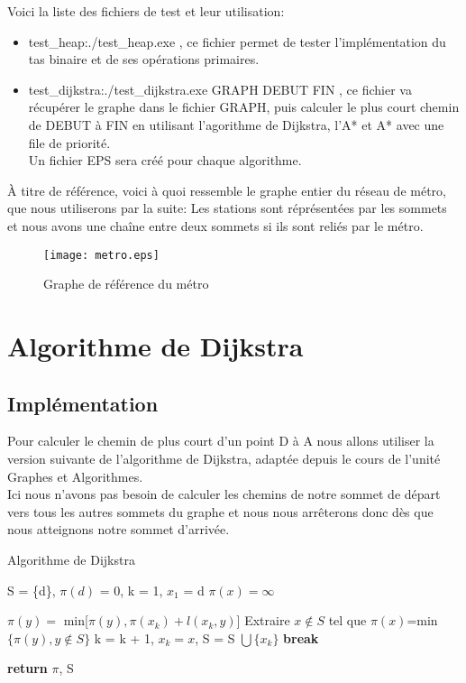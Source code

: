 \documentclass{article}
\begin{document}
Voici la liste des fichiers de test et leur utilisation:
\begin{itemize}
	\item test\_heap:./test\_heap.exe , ce fichier permet de tester l'implémentation du tas
		  binaire et de ses opérations primaires.
	\item test\_dijkstra:./test\_dijkstra.exe GRAPH DEBUT FIN , ce fichier va récupérer
		  le graphe dans le fichier GRAPH, puis calculer le plus court chemin de DEBUT à FIN
		  en utilisant l'agorithme de Dijkstra, l'A* et A* avec une file de priorité.\\
		  Un fichier EPS sera créé pour chaque algorithme.\\
\end{itemize}

À titre de référence, voici à quoi ressemble le graphe entier du réseau de métro, que nous
utiliserons par la suite:
Les stations sont réprésentées par les sommets et nous avons une chaîne entre deux sommets
si ils sont reliés par le métro.

\begin{figure}[!hbt]
	\centering
	\texttt{[image: metro.eps]}
	\caption{Graphe de référence du métro}
	\label{metro}
\end{figure}

\clearpage
\section{Algorithme de Dijkstra}
\subsection{Implémentation}

Pour calculer le chemin de plus court d'un point D à A nous allons utiliser 
la version suivante de l'algorithme de Dijkstra, adaptée depuis le cours de 
l'unité Graphes et Algorithmes.\\

Ici nous n'avons pas besoin de calculer les chemins de notre sommet de départ
vers tous les autres sommets du graphe et nous nous arrêterons donc dès
que nous atteignons notre sommet d'arrivée.

\begin{algorithm}
\caption{Algorithme de Dijkstra}\label{dijkstra}
\begin{algorithmic}[1]
	\State S = \{d\}, $\pi(d)$ = 0, k = 1, $x_1$ = d
		\State $\pi(x) = \infty$
	\EndFor
	
			\State $\pi(y) = $ min[$\pi(y), \pi(x_k) + l(x_k, y)$]
		\EndFor
		\State Extraire $x \not\in S$ tel que $\pi(x)$=min$\{\pi(y), y \not\in S\}$
		\State k = k + 1, $x_k = x$, S = S $\bigcup \{x_k\}$
			\State \textbf{break}
		\EndIf
	\EndWhile
	
	\State \textbf{return} $\pi$, S
\EndProcedure
\end{algorithmic}
\end{algorithm}
\end{document}
